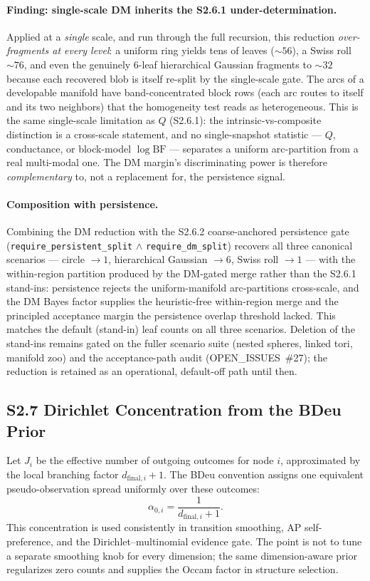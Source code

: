 \documentclass[11pt]{article}
\begin{document}
\paragraph{Finding: single-scale DM inherits the S2.6.1 under-determination.}
Applied at a \emph{single} scale, and run through the full recursion, this
reduction \emph{over-fragments at every level}: a uniform ring yields tens of
leaves ($\sim 56$), a Swiss roll $\sim 76$, and even the genuinely $6$-leaf
hierarchical Gaussian fragments to $\sim 32$ because each recovered blob is
itself re-split by the single-scale gate. The arcs of a developable manifold
have band-concentrated block rows (each arc routes to itself and its two
neighbors) that the homogeneity test reads as heterogeneous. This is the
same single-scale limitation as $Q$ (S2.6.1): the intrinsic-vs-composite
distinction is a cross-scale statement, and no single-snapshot statistic --- $Q$,
conductance, or block-model $\log\mathrm{BF}$ --- separates a uniform arc-partition
from a real multi-modal one. The DM margin's discriminating power is therefore
\emph{complementary} to, not a replacement for, the persistence signal.

\paragraph{Composition with persistence.} Combining the DM reduction with the
S2.6.2 coarse-anchored persistence gate (\texttt{require\_persistent\_split} $\wedge$
\texttt{require\_dm\_split}) recovers all three canonical scenarios --- circle
$\to 1$, hierarchical Gaussian $\to 6$, Swiss roll $\to 1$ --- with the
within-region partition produced by the DM-gated merge rather than the S2.6.1
stand-ins: persistence rejects the uniform-manifold arc-partitions cross-scale,
and the DM Bayes factor supplies the heuristic-free within-region merge and the
principled acceptance margin the persistence overlap threshold lacked. This
matches the default (stand-in) leaf counts on all three scenarios. Deletion of
the stand-ins remains gated on the fuller scenario suite (nested spheres, linked
tori, manifold zoo) and the acceptance-path audit (OPEN\_ISSUES~\#27); the
reduction is retained as an operational, default-off path until then.

\subsection*{S2.7 Dirichlet Concentration from the BDeu Prior}
\label{sec:si-bdeu-prior}
Let $J_i$ be the effective number of outgoing outcomes for node $i$, approximated by the local branching factor $d_{\mathrm{final},i}+1$. The BDeu convention assigns one equivalent pseudo-observation spread uniformly over these outcomes:
\[
\alpha_{0,i}=\frac{1}{d_{\mathrm{final},i}+1}.
\label{eq:si-bdeu-alpha}
\]
This concentration is used consistently in transition smoothing, AP self-preference, and the Dirichlet--multinomial evidence gate. The point is not to tune a separate smoothing knob for every dimension; the same dimension-aware prior regularizes zero counts and supplies the Occam factor in structure selection.
\end{document}

